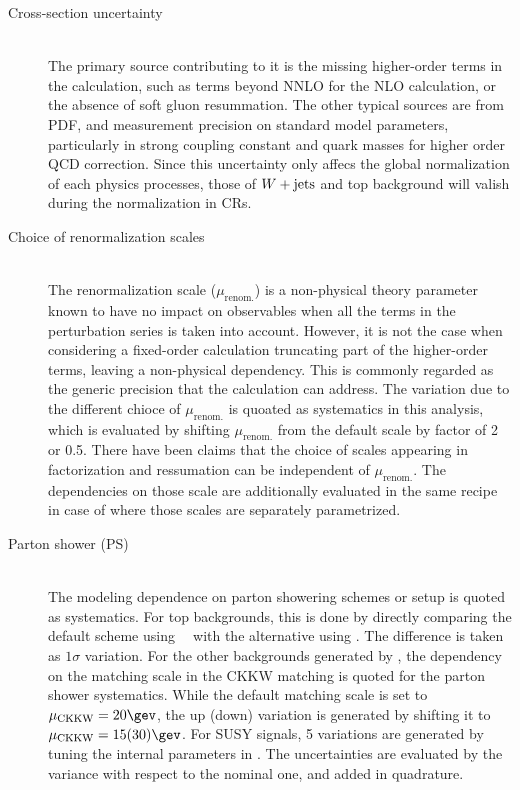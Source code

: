 \begin{description}
\item [Cross-section uncertainty] \mbox{} \\
The primary source contributing to it is the missing higher-order terms in the calculation, such as terms beyond NNLO for the NLO calculation, or the absence of soft gluon resummation. 
The other typical sources are from PDF, and measurement precision on standard model parameters, particularly in strong coupling constant and quark masses for higher order QCD correction. 
Since this uncertainty only affecs the global normalization of each physics processes, those of $W+\mathrm{jets}$ and top background will valish during the normalization in CRs.

\item [Choice of renormalization scales] \mbox{} \\
The renormalization scale ($\mu_{\mathrm{renom.}}$) is a non-physical theory parameter known to have no impact on observables when all the terms in the perturbation series is taken into account. However, it is not the case when considering a fixed-order calculation truncating part of the higher-order terms, leaving a non-physical dependency. This is commonly regarded as the generic precision that the calculation can address. The variation due to the different chioce of $\mu_{\mathrm{renom.}}$ is quoated as systematics in this analysis, which is evaluated by shifting $\mu_{\mathrm{renom.}}$ from the default scale by factor of 2 or 0.5.
There have been claims that the choice of scales appearing in factorization and ressumation can be independent of $\mu_{\mathrm{renom.}}$. The dependencies on those scale are additionally evaluated in the same recipe in case of \sherpa where those scales are separately parametrized.

\item [Parton shower (PS)]  \mbox{} \\
The modeling dependence on parton showering schemes or setup is quoted as systematics.
For top backgrounds, this is done by directly comparing the default scheme using \pythiasix $\mbox{\phantom{k}}$ with the alternative using \herwig. The difference is taken as $1\sigma$ variation. 
For the other backgrounds generated by \sherpa, the dependency on the matching scale in the CKKW matching is quoted for the parton shower systematics. 
While the default matching scale is set to $\mu_{\mathrm{CKKW}} = 20\gev$, the up (down) variation is generated by shifting it to $\mu_{\mathrm{CKKW}} = 15 (30) \gev$. 
For SUSY signals, 5 variations are generated by tuning the internal parameters in \pythiaeight. The uncertainties are evaluated by the variance with respect to the nominal one, and added in quadrature. 



\end{description}
